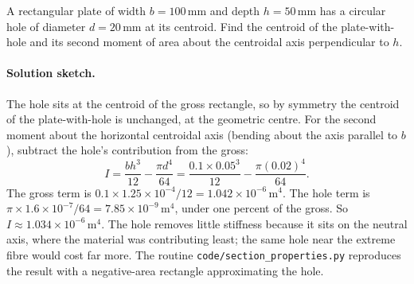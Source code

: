 \begin{exercise}
A rectangular plate of width $b = 100\,\si{\milli\meter}$ and depth
$h = 50\,\si{\milli\meter}$ has a circular hole of diameter $d =
20\,\si{\milli\meter}$ at its centroid. Find the centroid of the
plate-with-hole and its second moment of area about the centroidal
axis perpendicular to $h$.

\paragraph{Solution sketch.} The hole sits at the centroid of the
gross rectangle, so by symmetry the centroid of the plate-with-hole is
unchanged, at the geometric centre. For the second moment about the
horizontal centroidal axis (bending about the axis parallel to $b$),
subtract the hole's contribution from the gross:
\[
I = \frac{b h^3}{12} - \frac{\pi d^4}{64}
= \frac{0.1 \times 0.05^3}{12} - \frac{\pi (0.02)^4}{64}.
\]
The gross term is $0.1 \times 1.25 \times 10^{-4} / 12 =
1.042 \times 10^{-6}\,\si{\meter\tothe{4}}$. The hole term is
$\pi \times 1.6 \times 10^{-7} / 64 = 7.85 \times 10^{-9}\,
\si{\meter\tothe{4}}$, under one percent of the gross. So
$I \approx 1.034 \times 10^{-6}\,\si{\meter\tothe{4}}$. The hole
removes little stiffness because it sits on the neutral axis, where the
material was contributing least; the same hole near the extreme fibre
would cost far more. The routine
\texttt{code/section\_properties.py} reproduces the result with a
negative-area rectangle approximating the hole.
\end{exercise}


